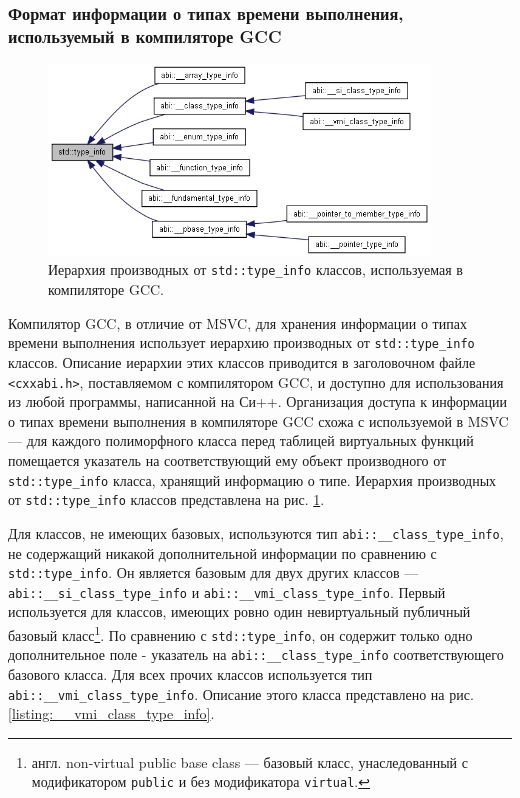 \subsubsection{Формат информации о типах времени выполнения, используемый в компиляторе GCC}\label{chapter:rtti_in_gcc}
\begin{figure}[htb!]
\centering
\includegraphics[width=0.9\textwidth]{images/gcc_rtti_hierarchy.png}
\caption{Иерархия производных от \lstinline{std::type_info} классов, используемая в компиляторе GCC.}
\label{fig:gcc_rtti_hierarchy}
\end{figure}


Компилятор GCC, в отличие от MSVC, для хранения информации о типах времени выполнения использует иерархию производных от \lstinline{std::type_info} классов. Описание иерархии этих классов приводится в заголовочном файле \lstinline{<cxxabi.h>}, поставляемом с компилятором GCC, и доступно для использования из любой программы, написанной на Си++. Организация доступа к информации о типах времени выполнения в компиляторе GCC схожа с используемой в MSVC --- для каждого полиморфного класса перед таблицей виртуальных функций помещается указатель на соответствующий ему объект производного от \lstinline{std::type_info} класса, хранящий информацию о типе. Иерархия производных от \lstinline{std::type_info} классов представлена на рис. \ref{fig:gcc_rtti_hierarchy}.

Для классов, не имеющих базовых, используются тип \lstinline{abi::__class_type_info}, не содержащий никакой дополнительной информации по сравнению с \lstinline{std::type_info}. Он является базовым для двух других классов --- \lstinline{abi::__si_class_type_info} и \lstinline{abi::__vmi_class_type_info}. Первый используется для классов, имеющих ровно один невиртуальный публичный базовый класс\footnote{англ. non-virtual public base class --- базовый класс, унаследованный с модификатором \lstinline{public} и без модификатора \lstinline{virtual}.}. По сравнению с \lstinline{std::type_info}, он содержит только одно дополнительное поле - указатель на \lstinline{abi::__class_type_info} соответствующего базового класса. Для всех прочих классов используется тип \lstinline{abi::__vmi_class_type_info}. Описание этого класса представлено на рис. \ref{listing:__vmi_class_type_info}.

